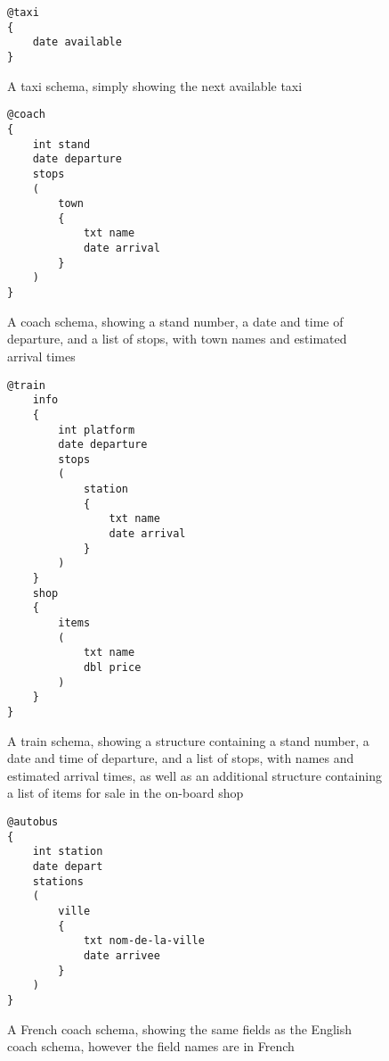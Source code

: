 \begin{figure}[tbh]
\begin{lstlisting}
@taxi
{
	date available
}
\end{lstlisting}
\caption[Example schema for a taxi]{A taxi schema, simply showing the next available taxi}
\label{fig:taxi-schema}
\end{figure}

\begin{figure}[tbh]
\begin{lstlisting}
@coach
{
    int stand
    date departure
    stops
    (
    	town
    	{
    		txt name
    		date arrival
    	}
    )
}
\end{lstlisting}
\caption[Example schema for a coach]{A coach schema, showing a stand number, a date and time of departure, and a list of stops, with town names and estimated arrival times}
\label{fig:coach-schema}
\end{figure}

\begin{figure}[tbh]
\begin{lstlisting}
@train
	info
	{
		int platform
		date departure
		stops
		(
			station
			{
				txt name
				date arrival
			}
		)
	}
	shop
	{
		items
		(
			txt name
			dbl price
		)
	}
}
\end{lstlisting}
\caption[Example schema for a train]{A train schema, showing a structure containing a stand number, a date and time of departure, and a list of stops, with names and estimated arrival times, as well as an additional structure containing a list of items for sale in the on-board shop}
\label{fig:train-schema}
\end{figure}


\begin{figure}[tbh]
\begin{lstlisting}
@autobus
{
    int station
    date depart
    stations
    (
    	ville
    	{
    		txt nom-de-la-ville
    		date arrivee
    	}
    )
}
\end{lstlisting}
\caption[Example schema for a French coach]{A French coach schema, showing the same fields as the English coach schema, however the field names are in French}
\label{fig:french-coach-schema}
\end{figure}
